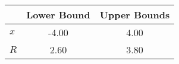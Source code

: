 \begin{tiny}\begin{tabular}{|l|c|c|}
\hline
&\textbf{Lower Bound}&\textbf{Upper Bounds}\\\hline
\textbf{$x$}&-4.00&4.00\\\hline
\textbf{$R$}&2.60&3.80\\\hline
\end{tabular}
\end{tiny}